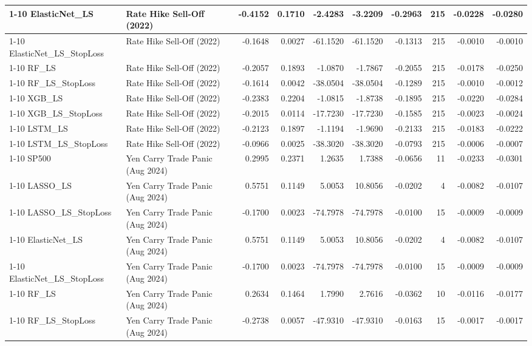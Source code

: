 \begin{tabular}{llrrrrrrrr}
\cline{1-10}
ElasticNet\_LS & Rate Hike Sell-Off (2022) & -0.4152 & 0.1710 & -2.4283 & -3.2209 & -0.2963 & 215 & -0.0228 & -0.0280 \\
\cline{1-10}
ElasticNet\_LS\_StopLoss & Rate Hike Sell-Off (2022) & -0.1648 & 0.0027 & -61.1520 & -61.1520 & -0.1313 & 215 & -0.0010 & -0.0010 \\
\cline{1-10}
RF\_LS & Rate Hike Sell-Off (2022) & -0.2057 & 0.1893 & -1.0870 & -1.7867 & -0.2055 & 215 & -0.0178 & -0.0250 \\
\cline{1-10}
RF\_LS\_StopLoss & Rate Hike Sell-Off (2022) & -0.1614 & 0.0042 & -38.0504 & -38.0504 & -0.1289 & 215 & -0.0010 & -0.0012 \\
\cline{1-10}
XGB\_LS & Rate Hike Sell-Off (2022) & -0.2383 & 0.2204 & -1.0815 & -1.8738 & -0.1895 & 215 & -0.0220 & -0.0284 \\
\cline{1-10}
XGB\_LS\_StopLoss & Rate Hike Sell-Off (2022) & -0.2015 & 0.0114 & -17.7230 & -17.7230 & -0.1585 & 215 & -0.0023 & -0.0024 \\
\cline{1-10}
LSTM\_LS & Rate Hike Sell-Off (2022) & -0.2123 & 0.1897 & -1.1194 & -1.9690 & -0.2133 & 215 & -0.0183 & -0.0222 \\
\cline{1-10}
LSTM\_LS\_StopLoss & Rate Hike Sell-Off (2022) & -0.0966 & 0.0025 & -38.3020 & -38.3020 & -0.0793 & 215 & -0.0006 & -0.0007 \\
\cline{1-10}
SP500 & Yen Carry Trade Panic (Aug 2024) & 0.2995 & 0.2371 & 1.2635 & 1.7388 & -0.0656 & 11 & -0.0233 & -0.0301 \\
\cline{1-10}
LASSO\_LS & Yen Carry Trade Panic (Aug 2024) & 0.5751 & 0.1149 & 5.0053 & 10.8056 & -0.0202 & 4 & -0.0082 & -0.0107 \\
\cline{1-10}
LASSO\_LS\_StopLoss & Yen Carry Trade Panic (Aug 2024) & -0.1700 & 0.0023 & -74.7978 & -74.7978 & -0.0100 & 15 & -0.0009 & -0.0009 \\
\cline{1-10}
ElasticNet\_LS & Yen Carry Trade Panic (Aug 2024) & 0.5751 & 0.1149 & 5.0053 & 10.8056 & -0.0202 & 4 & -0.0082 & -0.0107 \\
\cline{1-10}
ElasticNet\_LS\_StopLoss & Yen Carry Trade Panic (Aug 2024) & -0.1700 & 0.0023 & -74.7978 & -74.7978 & -0.0100 & 15 & -0.0009 & -0.0009 \\
\cline{1-10}
RF\_LS & Yen Carry Trade Panic (Aug 2024) & 0.2634 & 0.1464 & 1.7990 & 2.7616 & -0.0362 & 10 & -0.0116 & -0.0177 \\
\cline{1-10}
RF\_LS\_StopLoss & Yen Carry Trade Panic (Aug 2024) & -0.2738 & 0.0057 & -47.9310 & -47.9310 & -0.0163 & 15 & -0.0017 & -0.0017 \\

\end{tabular}

